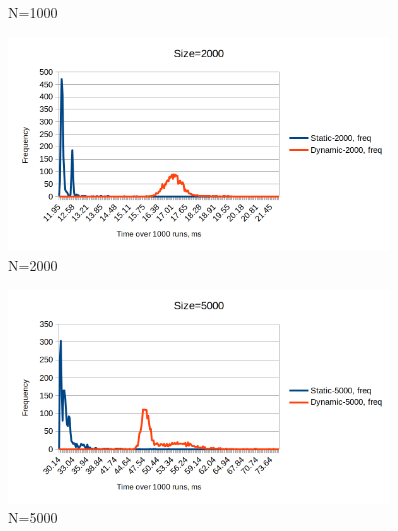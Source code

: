 \documentclass[a4paper,11pt]{article}
\begin{document}
\begin{appendices}
\begin{figure}[H]
            \caption{N=1000}
        \end{figure}
        \begin{figure}[H]
            \centering
            \includegraphics[width=0.9\textwidth]{size2000histo.png}
            \caption{N=2000}
        \end{figure}
        \begin{figure}[H]
            \centering
            \includegraphics[width=0.9\textwidth]{size5000histo.png}
            \caption{N=5000}
        \end{figure}
    \end{appendices}
\end{document}
